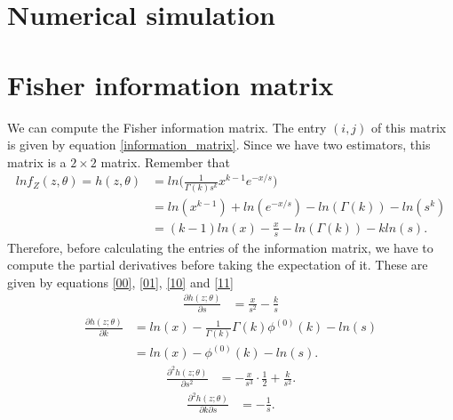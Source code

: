 \documentclass[final]{aomart}
\newtheorem[{}\it]{thm}{Theorem}[section]
\theoremstyle{definition}
\newtheorem*[{}\it]{notation}{Notation}
\numberwithin{equation}{section}
\begin{document}
\section{Numerical simulation}
\section{Fisher information matrix}
We can compute the Fisher information matrix. The entry $(i,j)$ of this matrix is given by equation \ref{information_matrix}. Since we have two estimators, this matrix is a $2\times 2$ matrix. Remember that
\begin{equation}
	\begin{aligned}
	lnf_Z(z,\theta) = h(z,\theta) & = ln\bigg( \frac{1}{\Gamma(k)s^k}x^{k-1}e^{-x/s} \bigg)\\
						   & = ln(x^{k-1}) + ln(e^{-x/s}) - ln(\Gamma(k)) - ln(s^k)\\
						   & = (k-1)ln(x) - \frac{x}{s} - ln(\Gamma(k)) - kln(s).
	\end{aligned}
\end{equation}
Therefore, before calculating the entries of the information matrix, we have to compute the partial derivatives before taking the expectation of it. These are given by equations \ref{00}, \ref{01}, \ref{10} and \ref{11}
\begin{equation}
	\begin{aligned}
	\frac{\partial h(z;\theta)}{\partial s} & = \frac{x}{s^2} - \frac{k}{s}
	\end{aligned}
\end{equation}
\begin{equation}
	\begin{aligned}
	\frac{\partial h(z;\theta)}{\partial k} & = ln(x) - \frac{1}{\Gamma(k)}\Gamma(k)\phi^{(0)}(k) - ln(s)\\
														  & = ln(x) - \phi^{(0)}(k) - ln(s).
	\end{aligned}
\end{equation}
\begin{equation}
	\begin{aligned}
	\frac{\partial^2h(z;\theta)}{\partial s^2} & = -\frac{x}{s^3}\cdot\frac{1}{2} + \frac{k}{s^2}.
	\end{aligned}
	\label{00}
\end{equation}
\begin{equation}
	\begin{aligned}
	\frac{\partial^2 h(z;\theta)}{\partial k \partial s} & = -\frac{1}{s}.
	\end{aligned}
	\label{01}
\end{equation}
\end{document}
